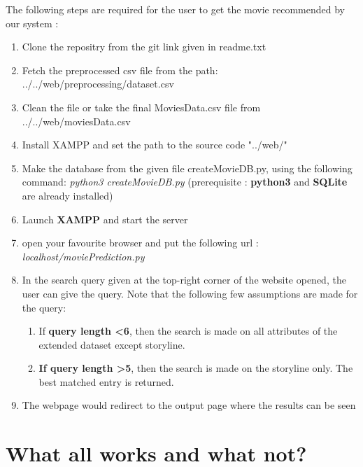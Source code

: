 \documentclass{article}
\begin{document}
The following steps are required for the user to get the movie recommended by our system : 
\begin{enumerate}
    \item Clone the repositry from the git link given in readme.txt 
    \item Fetch the preprocessed csv file from the path:
    ../../web/preprocessing/dataset.csv
    \item Clean the file or take the final MoviesData.csv file from ../../web/moviesData.csv
    \item Install XAMPP and set the path to the source code "../web/"
    \item Make the database from the given file createMovieDB.py, using the following command:\newline
    \textit{python3 createMovieDB.py} \newline
    (prerequisite : \textbf{python3} and \textbf{SQLite} are already installed)
    \item Launch \textbf{XAMPP} and start the server
    \item open your favourite browser and put the following url : 
    \textit{localhost/moviePrediction.py}
    \item In the search query given at the top-right corner of the website opened, the user can give the query. Note that the following few assumptions are made for the query:
        \begin{enumerate}
        \item If \textbf{query length \textless  6}, then the search is made on all attributes of the extended dataset except storyline.
        \item \textbf{If query length \textgreater 5}, then the search is made on the storyline only. The best matched entry  is returned.
        \end{enumerate}
    \item The webpage would redirect to the output page where the results can be seen
\end{enumerate}

\section{What all works and what not?}
\end{document}
